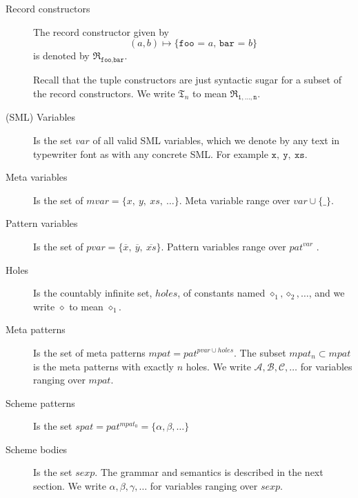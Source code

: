 \begin{description}
\item[Record constructors] The record constructor given by
  \[
  (a, b) \mapsto \texttt{\{foo = $a$, bar = $b$\}}
  \]
  is denoted by $\mathfrak{R}_{\texttt{foo},\texttt{bar}}$.

  Recall that the tuple constructors are just syntactic sugar for a subset of
  the record constructors. We write $\mathfrak{T}_n$ to mean
  $\mathfrak{R}_{\texttt{1},\ldots,\texttt{n}}$.


\item[(SML) Variables] Is the set $var$ of all valid SML variables, which we
  denote by any text in typewriter font as with any concrete SML. For example
  $\mathtt{x},\ \mathtt{y},\ \mathtt{xs}$.



\item[Meta variables] Is the set of $mvar = \{x,\ y,\ xs,\ \ldots \}$. Meta
  variable range over $var \cup \{\texttt{_}\}$.


\item[Pattern variables] Is the set of $pvar = \{ \overline{x},\ \overline{y},\
  \overline{xs} \}$. Pattern variables range over $pat^{var}$ .


\item[Holes] Is the countably infinite set, $holes$, of constants named
  $\diamond_1, \diamond_2, \ldots$, and we write $\diamond$ to mean
  $\diamond_1$.


\item[Meta patterns] Is the set of meta patterns $mpat = pat^{pvar \cup
    holes}$. The subset $mpat_n \subset mpat$ is the meta patterns with exactly
  $n$ holes. We write $\mathcal{A},\mathcal{B}, \mathcal{C}, \ldots$ for
  variables ranging over $mpat$.


\item[Scheme patterns] Is the set $spat = pat^{mpat_0} = \{\alpha, \beta, \ldots
  \}$


\item[Scheme bodies] Is the set $sexp$. The grammar and semantics is described
  in the next section. We write $\alpha, \beta, \gamma, \ldots$ for variables
  ranging over $sexp$.



\end{description}

